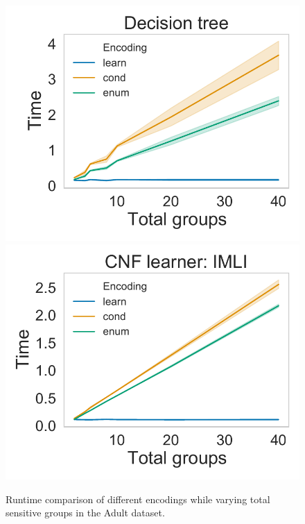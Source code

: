 \begin{figure}[t!]
	\begin{center}
		\includegraphics[scale=.4]{figures/fairness/justicia/encoding_runtime_Adult_DT.pdf}
		\includegraphics[scale=.4]{figures/fairness/justicia/encoding_runtime_Adult_IMLI.pdf}
		\hfill
		\caption[Runtime of different encodings in {\justicia}]{Runtime comparison of different encodings while varying total sensitive groups in the Adult dataset. }
		\label{fairness_justicia_fig:runtime_diff_encodings}
	\end{center}
\end{figure}



